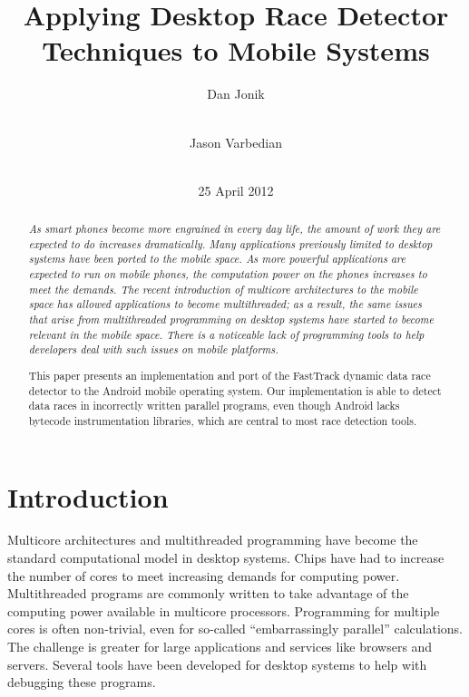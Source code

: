 \documentclass{acm_proc_article-sp}
\begin{document}
\title{Applying Desktop Race Detector Techniques to Mobile Systems}
\author{
\alignauthor Dan Jonik\\
\\
\and
\alignauthor Jason Varbedian\\
\\
}
\date{25 April 2012}
\maketitle

\begin{abstract}
\itshape
As smart phones become more engrained in every day life, the amount of work they are expected to do increases dramatically. Many applications previously limited to desktop systems have been ported to the mobile space. As more powerful applications are expected to run on mobile phones, the computation power on the phones increases to meet the demands. The recent introduction of multicore architectures to the mobile space has allowed applications to become multithreaded; as a result, the same issues that arise from multithreaded programming on desktop systems have started to become relevant in the mobile space. There is a noticeable lack of programming tools to help developers deal with such issues on mobile platforms.
 
This paper presents an implementation and port of the FastTrack dynamic data race detector to the Android mobile operating system. Our implementation is able to detect data races in incorrectly written parallel programs, even though Android lacks bytecode instrumentation libraries, which are central to most race detection tools.
\end{abstract}

\section{Introduction}
Multicore architectures and multithreaded programming have become the standard computational model in desktop systems. Chips have had to increase the number of cores to meet increasing demands for computing power. Multithreaded programs are commonly written to take advantage of the computing power available in multicore processors. Programming for multiple cores is often non-trivial, even for so-called ``embarrassingly parallel'' calculations. The challenge is greater for large applications and services like browsers and servers. Several tools have been developed for desktop systems to help with debugging these programs.
 
\end{document}
